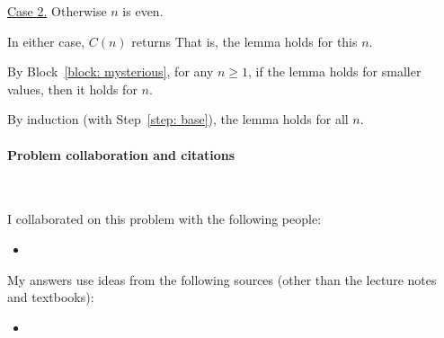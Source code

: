 \begin{enumerate}[label=(\alph*)]
\begin{longFormProof}
\begin{block}
\begin{block}
\begin{blue}
        \end{blue}

      \end{block}

      \begin{block}
        \step \underline{Case 2.} Otherwise $n$ is even. 

        \begin{blue}

          \step \REPLACEME

          \step \REPLACEME


        \end{blue}
        
      \end{block}

      \step In either case, $C(n)$ returns 
      That is, the lemma holds for this $n$.
    \end{block}

    \step By Block~\ref{block: mysterious}, for any $n\ge 1$, if the lemma holds for smaller values,
    then it holds for $n$.

    \step By induction (with Step~\ref{step: base}), the lemma holds for all $n$.
    
  \end{longFormProof}

\end{enumerate}



\vfill

\paragraph{Problem  collaboration and citations}~

I collaborated on this problem with the following people:
\begin{blue}
  \begin{itemize}
  \item \REPLACEME                    %
  \end{itemize}
\end{blue}

My answers use ideas from the following sources (other than the lecture notes and textbooks): 
\begin{blue}
  \begin{itemize}
  \item \REPLACEME                    %
  \end{itemize}
\end{blue}


